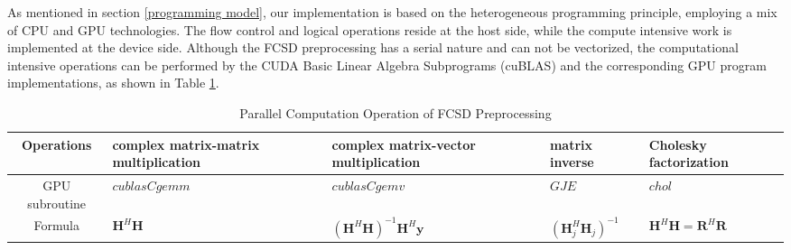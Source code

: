 \documentclass[letterpaper, 10pt, conference, twoside]{ieeeconf}
\begin{document}
As mentioned in section \ref{programming model}, our implementation is based on the heterogeneous programming principle, employing a mix of CPU and GPU technologies. The flow control and logical operations reside at the host side, while the compute intensive work is implemented at the device side. Although the FCSD preprocessing has a serial nature and can not be vectorized, the computational intensive operations can be performed by the CUDA Basic Linear Algebra Subprograms (cuBLAS)\cite{nvidia2013basic} and the corresponding GPU program implementations, as shown in Table \ref{table1}.
\begin{table}[htb]
\centering
\caption{Parallel Computation Operation of FCSD Preprocessing}
\begin{tabular}{|c|p{3cm}|p{3cm}|p{3cm}|p{3cm}|}
\hline
Operations & complex matrix-matrix multiplication & complex matrix-vector multiplication & matrix inverse & Cholesky factorization \\
\hline
GPU subroutine & $\mathit{cublasCgemm}$  & $\mathit{cublasCgemv}$ & $\mathit{GJE}$ & $\mathit{chol}$\\
\hline
\multirow{2}{*}{Formula}   &  \multirow{2}{*}{$\mathbf{H}^{H}\mathbf{H}$} & \multirow{2}{*}{$(\mathbf{H}^{H}\mathbf{H})^{-1}\mathbf{H}^{H}\mathbf{y}$} & \multirow{2}{*}{$(\mathbf{H}_{j}^{H}\mathbf{H}_{j})^{-1} $} & \multirow{2}{*}{$\mathbf{H}^{H}\mathbf{H}=\mathbf{R}^{H}\mathbf{R}$} \\[10pt]

\hline
\end{tabular}
\label{table1}
\end{table}
\end{document}
